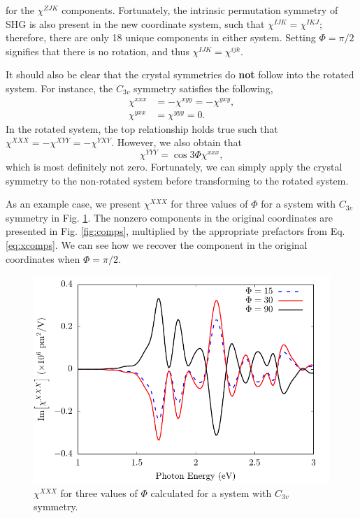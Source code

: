 \documentclass[aps,prb,10pt,letterpaper,notitlepage]{revtex4-1}
\begin{document}
for the $\chi^{ZJK}$ components. Fortunately, the intrinsic permutation symmetry
of SHG is also present in the new coordinate system, such that $\chi^{IJK} =
\chi^{IKJ}$; therefore, there are only 18 unique components in either system.
Setting $\Phi = \pi/2$ signifies that there is no rotation, and thus $\chi^{IJK}
= \chi^{ijk}$.

It should also be clear that the crystal symmetries do \textbf{not} follow into
the rotated system. For instance, the $C_{3v}$ symmetry satisfies the following,
\begin{equation*}
\begin{split}
\chi^{xxx} &= -\chi^{xyy} = - \chi^{yxy},\\
\chi^{yxx} &= \chi^{yyy} = 0.
\end{split}
\end{equation*}
In the rotated system, the top relationship holds true such that $\chi^{XXX} =
-\chi^{XYY} = - \chi^{YXY}$. However, we also obtain that
\begin{equation*}
\chi^{YYY} = \cos3\Phi \chi^{xxx},
\end{equation*}
which is most definitely not zero. Fortunately, we can simply apply the crystal
symmetry to the non-rotated system before transforming to the rotated system.

As an example case, we present $\chi^{XXX}$ for three values of $\Phi$ for a
system with $C_{3v}$ symmetry in Fig. \ref{fig:rotxxx}. The nonzero components
in the original coordinates are presented in Fig. \ref{fig:comps}, multiplied by
the appropriate prefactors from Eq. \eqref{eq:xcomps}. We can see how we recover
the component in the original coordinates when $\Phi = \pi/2$.

\begin{figure}[t]
\centering
\includegraphics[width=0.4\linewidth]{rot/rotxxx.pdf}
\caption{$\chi^{XXX}$ for three values of $\Phi$ calculated for a system with
$C_{3v}$ symmetry.}
\label{fig:rotxxx}
\end{figure}
\end{document}
